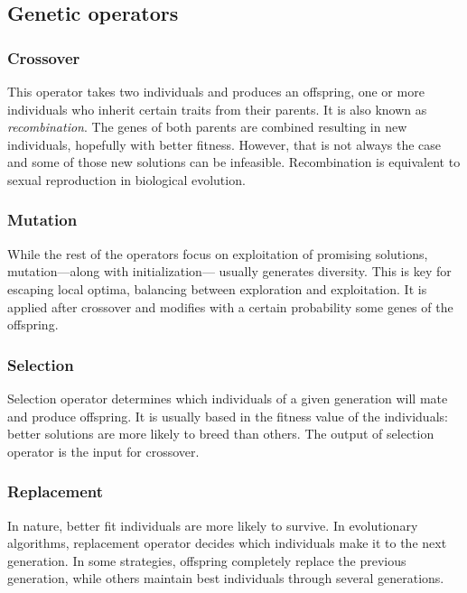 \subsection{Genetic operators}
	\subsubsection{Crossover}
		This operator takes two individuals and produces an offspring, one or more individuals who inherit certain traits from their parents. It is also known as \textit{recombination}. The genes of both parents are combined resulting in new individuals, hopefully with better fitness. However, that is not always the case and some of those new solutions can be infeasible. Recombination is equivalent to sexual reproduction in biological evolution.  
	\subsubsection{Mutation}
		While the rest of the operators focus on exploitation of promising solutions, mutation---along with initialization--- usually generates diversity. This is key for escaping local optima, balancing between exploration and exploitation. It is applied after crossover and modifies with a certain probability some genes of the offspring.
	\subsubsection{Selection}
		Selection operator determines which individuals of a given generation will mate and produce offspring. It is usually based in the fitness value of the individuals: better solutions are more likely to breed than others. The output of selection operator is the input for crossover.
	\subsubsection{Replacement}
		In nature, better fit individuals are more likely to survive. In evolutionary algorithms, replacement operator decides which individuals make it to the next generation. In some strategies, offspring completely replace the previous generation, while others maintain best individuals through several generations. 
